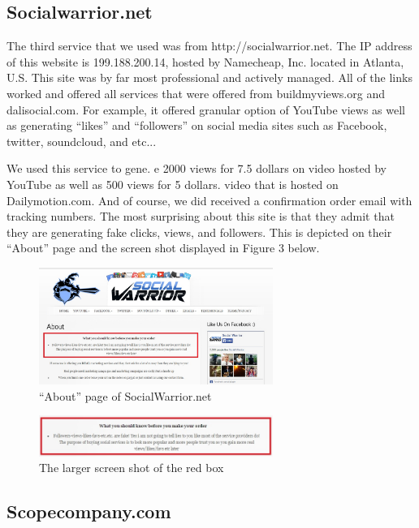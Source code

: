\documentclass[conference]{IEEEtran}
\begin{document}
\subsection{Socialwarrior.net}

The third service that we used was from http://socialwarrior.net. The IP address of this website is 199.188.200.14, hosted by Namecheap, Inc. located in Atlanta, U.S. This site was by far most professional and actively managed. All of the links worked and offered all services that were offered from buildmyviews.org and dalisocial.com. For example, it offered granular option of YouTube views as well as generating “likes” and “followers” on social media sites such as Facebook, twitter, soundcloud, and etc...

We used this service to gene. e 2000 views for 7.5 dollars on video hosted by YouTube as well as 500 views for 5 dollars. video that is hosted on Dailymotion.com. And of course, we did received a confirmation order email with tracking numbers. The most surprising about this site is that they admit that they are generating fake clicks, views, and followers. This is depicted on their “About” page and the screen shot displayed in Figure 3 below.

\begin{figure}
  \centering
  \includegraphics[width=3.0in]{fig3a}
  \caption{``About'' page of SocialWarrior.net}
\end{figure}

\begin{figure}
  \centering
  \includegraphics[width=3.0in]{fig3b}
  \caption{The larger screen shot of the red box}
\end{figure}

\subsection{Scopecompany.com}
\end{document}
